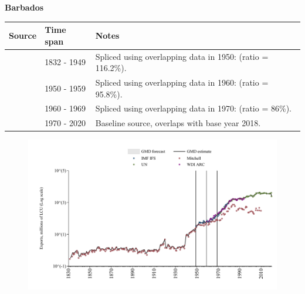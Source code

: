 \documentclass[12pt,a4paper,landscape]{article}
\begin{document}
\begin{adjustbox}{max totalsize={\paperwidth}{\paperheight},center}
\begin{minipage}[t][\textheight][t]{\textwidth}
\vspace*{0.5cm}
{}
\begin{center}
{\Large\bfseries Barbados}
\end{center}
\vspace{0.5cm}
\begin{table}[H]
\centering
\small
\begin{tabular}{|l|l|l|}
\hline
\textbf{Source} & \textbf{Time span} & \textbf{Notes} \\
\hline
\rowcolor{white}\cite{Mitchell}& 1832 - 1949 &Spliced using overlapping data in 1950: (ratio = 116.2\%).\\
\rowcolor{lightgray}\cite{IMF_IFS}& 1950 - 1959 &Spliced using overlapping data in 1960: (ratio = 95.8\%).\\
\rowcolor{white}\cite{WDI_ARC}& 1960 - 1969 &Spliced using overlapping data in 1970: (ratio = 86\%).\\
\rowcolor{lightgray}\cite{UN}& 1970 - 2020 &Baseline source, overlaps with base year 2018.\\
\hline
\end{tabular}
\end{table}
\begin{figure}[H]
\centering
\includegraphics[width=\textwidth,height=0.6\textheight,keepaspectratio]{graphs/BRB_exports.pdf}
\end{figure}
\end{minipage}
\end{adjustbox}
\end{document}
